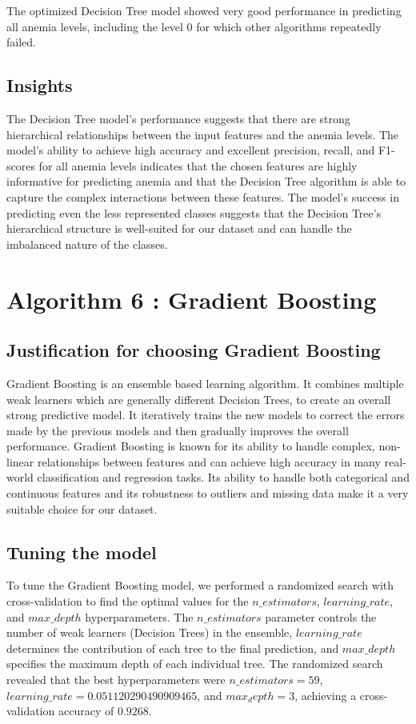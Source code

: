 The optimized Decision Tree model showed very good performance in predicting all anemia levels, including the level 0 for which other algorithms repeatedly failed.


\subsection{Insights}

The Decision Tree model's performance suggests that there are strong hierarchical relationships between the input features and the anemia levels. The model's ability to achieve high accuracy and excellent precision, recall, and F1-scores for all anemia levels indicates that the chosen features are highly informative for predicting anemia and that the Decision Tree algorithm is able to capture the complex interactions between these features. The model's success in predicting even the less represented classes suggests that the Decision Tree's hierarchical structure is well-suited for our dataset and can handle the imbalanced nature of the classes.


\section{Algorithm 6 : Gradient Boosting}

\subsection{Justification for choosing Gradient Boosting}

Gradient Boosting is an ensemble based learning algorithm. It combines multiple weak learners which are generally different Decision Trees, to create an overall strong predictive model. It iteratively trains the new models to correct the errors made by the previous models and then gradually improves the overall performance. Gradient Boosting is known for its ability to handle complex, non-linear relationships between features and can achieve high accuracy in many real-world classification and regression tasks. Its ability to handle both categorical and continuous features and its robustness to outliers and missing data make it a very suitable choice for our dataset.


\subsection{Tuning the model}

To tune the Gradient Boosting model, we performed a randomized search with cross-validation to find the optimal values for the $n\_estimators$, $learning\_rate$, and $max\_depth$ hyperparameters. The $n\_estimators$ parameter controls the number of weak learners (Decision Trees) in the ensemble, $learning\_rate$ determines the contribution of each tree to the final prediction, and $max\_depth$ specifies the maximum depth of each individual tree. The randomized search revealed that the best hyperparameters were $n\_estimators=59$, $learning\_rate=0.051120290490909465$, and $max_depth=3$, achieving a cross-validation accuracy of $0.9268$.

